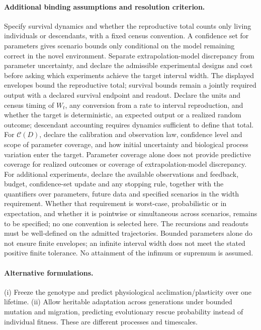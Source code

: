 \documentclass[11pt]{article}
\begin{document}
\paragraph{Additional binding assumptions and resolution criterion.} Specify survival dynamics and whether the reproductive total counts only living individuals or descendants, with a fixed census convention. A confidence set for parameters gives scenario bounds only conditional on the model remaining correct in the novel environment. Separate extrapolation-model discrepancy from parameter uncertainty, and declare the admissible experimental designs and cost before asking which experiments achieve the target interval width. The displayed envelopes bound the reproductive total; survival bounds remain a jointly required output with a declared survival endpoint and readout. Declare the units and census timing of $W_t$, any conversion from a rate to interval reproduction, and whether the target is deterministic, an expected output or a realized random outcome; descendant accounting requires dynamics sufficient to define that total. For $\mathcal C(D)$, declare the calibration and observation law, confidence level and scope of parameter coverage, and how initial uncertainty and biological process variation enter the target. Parameter coverage alone does not provide predictive coverage for realized outcomes or coverage of extrapolation-model discrepancy. For additional experiments, declare the available observations and feedback, budget, confidence-set update and any stopping rule, together with the quantifiers over parameters, future data and specified scenarios in the width requirement. Whether that requirement is worst-case, probabilistic or in expectation, and whether it is pointwise or simultaneous across scenarios, remains to be specified; no one convention is selected here. The recursions and readouts must be well-defined on the admitted trajectories. Bounded parameters alone do not ensure finite envelopes; an infinite interval width does not meet the stated positive finite tolerance. No attainment of the infimum or supremum is assumed.

\paragraph{Alternative formulations.} (i) Freeze the genotype and predict physiological acclimation/plasticity over one lifetime. (ii) Allow heritable adaptation across generations under bounded mutation and migration, predicting evolutionary rescue probability instead of individual fitness. These are different processes and timescales.
\end{document}

